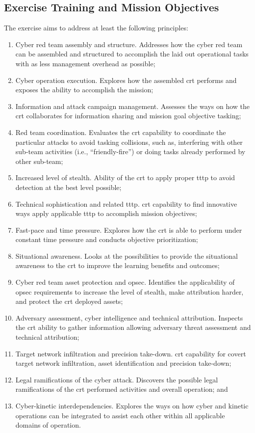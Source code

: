 \subsection{Exercise Training and Mission Objectives}
\label{sec:to}
The exercise aims to address at least the following principles: 
\begin{enumerate}
    \item Cyber red team assembly and structure. Addresses how the cyber red team can be assembled and structured to accomplish the laid out operational tasks with as less management overhead as possible;
    \item Cyber operation execution. Explores how the assembled \gls{crt} performs and exposes the ability to accomplish the mission;
    \item Information and attack campaign management. Assesses the ways on how the \gls{crt} collaborates for information sharing and mission goal objective tasking;
    \item Red team coordination. Evaluates the \gls{crt} capability to coordinate the particular attacks to avoid tasking collisions, such as, interfering with other sub-team activities (i.e., ``friendly-fire'') or doing tasks already performed by other sub-team;
    \item Increased level of stealth. Ability of the \gls{crt} to apply proper \gls{tttp} to avoid detection at the best level possible;
    \item Technical sophistication and related \gls{tttp}. \gls{crt} capability to find innovative ways apply applicable \gls{tttp} to accomplish mission objectives;
    \item Fast-pace and time pressure. Explores how the \gls{crt} is able to perform under constant time pressure and conducts objective prioritization;
    \item Situational awareness. Looks at the possibilities to provide the situational awareness to the \gls{crt} to improve the learning benefits and outcomes;
    \item Cyber red team asset protection and \gls{opsec}. Identifies the applicability of \gls{opsec} requirements to increase the level of stealth, make attribution harder, and protect the \gls{crt} deployed assets;
    \item Adversary assessment, cyber intelligence and technical attribution. Inspects the \gls{crt} ability to gather information allowing adversary threat assessment and technical attribution;
    \item Target network infiltration and precision take-down. \gls{crt} capability for covert target network infiltration, asset identification and precision take-down;
    \item Legal ramifications of the cyber attack. Discovers the possible legal ramifications of the \gls{crt} performed activities and overall operation; and
    \item Cyber-kinetic interdependencies. Explores the ways on how cyber and kinetic operations can be integrated to assist each other within all applicable domains of operation.
\end{enumerate}
